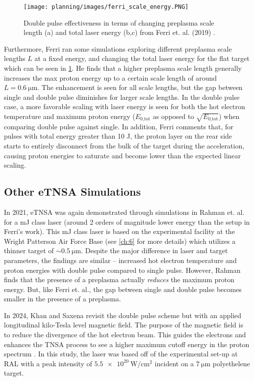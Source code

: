 \begin{figure}
	\centering 
	\texttt{[image: planning/images/ferri\_scale\_energy.PNG]}
	\caption{Double pulse effectiveness in terms of changing preplasma scale length (a) and total laser energy (b,c) from Ferri et. al. (2019) \cite{Ferri_2019_Nat_Comm}.}
	\label{fig:ferri_scale_energy}
\end{figure}

Furthermore, Ferri ran some simulations exploring different preplasma scale lengths $L$ at a fixed energy, and changing the total laser energy for the flat target \cite{Ferri_2019_Nat_Comm} which can be seen in \cref{fig:ferri_scale_energy}. He finds that a higher preplasma scale length generally increases the max proton energy up to a certain scale length of around $L = \SI{0.6}{\micro \meter}$. The enhancement is seen for all scale lengths, but the gap between single and double pulse diminishes for larger scale lengths. In the double pulse case, a more favorable scaling with laser energy is seen for both the hot electron temperature and maximum proton energy ($E_\text{0,tot}$ as opposed to $\sqrt{E_\text{0,tot}}$) when comparing double pulse against single. In addition, Ferri comments that, for pulses with total energy greater than 10 J, the proton layer on the rear side starts to entirely disconnect from the bulk of the target during the acceleration, causing proton energies to saturate and become lower than the expected linear scaling.

\subsection{Other eTNSA Simulations}
In 2021, \gls{eTNSA} was again demonstrated through simulations in Rahman et. al. \cite{Rahman_2021_PoP} for a mJ class laser (around 2 orders of magnitude lower energy than the setup in Ferri's work). This mJ class laser is based on the experimental facility at the Wright Patterson Air Force Base (see \cref{ch:6} for more details) which utilizes a thinner target of $\sim \SI{0.5}{\micro \meter}$. Despite the major difference in laser and target parameters, the findings are similar -- increased hot electron temperature and proton energies with double pulse compared to single pulse. However, Rahman finds that the presence of a preplasma actually \emph{reduces} the maximum proton energy. But, like Ferri et. al., the gap between single and double pulse becomes smaller in the presence of a preplasma.

In 2024, Khan and Saxena \cite{Khan_2024_NJoP} revisit the double pulse scheme but with an applied longitudinal kilo-Tesla level magnetic field. The purpose of the magnetic field is to reduce the divergence of the hot electron beam. This guides the electrons and enhances the \gls{TNSA} process to see a higher maximum cutoff energy in the proton spectrum \cite{Arefiev_2016_NJoP}. In this study, the laser was based off of the experimental set-up at \gls{RAL} with a peak intensity of $\SI{5.5e20}{\watt \per \centi \meter \squared}$ incident on a $\SI{7}{\micro \meter}$ polyethelene target. 

